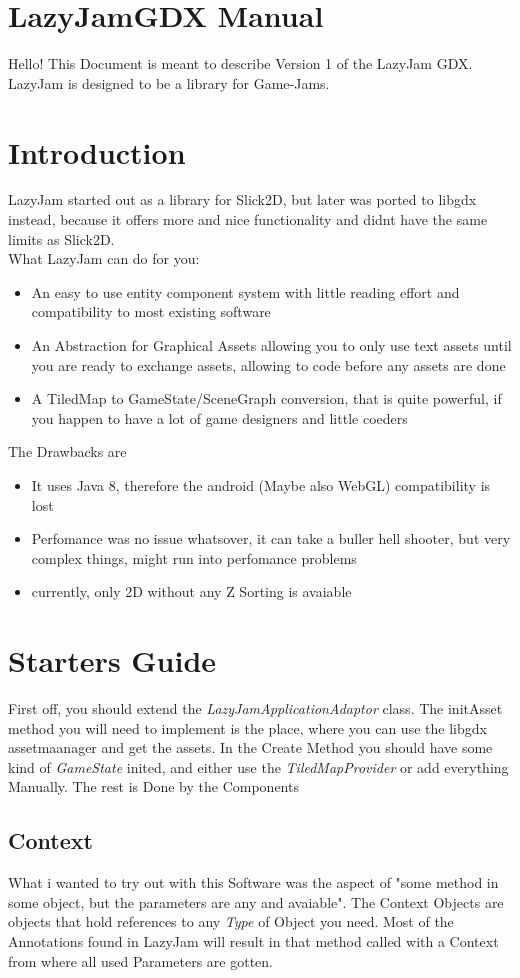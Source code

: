 \documentclass{article}
\begin{document}
\section{LazyJamGDX Manual}
Hello! This Document is meant to describe Version 1 of the LazyJam GDX.
LazyJam is designed to be a library for Game-Jams.

\section{Introduction}
LazyJam started out as a library for Slick2D, but later was ported to libgdx instead, because it offers more and nice functionality and didnt have the same limits as Slick2D.\\
What LazyJam can do for you:
\begin{itemize}
\item An easy to use entity component system with little reading effort and compatibility to most existing software
\item An Abstraction for Graphical Assets allowing you to only use text assets until you are ready to exchange assets, allowing to code before any assets are done
\item A TiledMap to GameState/SceneGraph conversion, that is quite powerful, if you happen to have a lot of game designers and little coeders
\end{itemize}
The Drawbacks are
\begin{itemize}
\item It uses Java 8, therefore the android (Maybe also WebGL) compatibility is lost
\item Perfomance was no issue whatsover, it can take a buller hell shooter, but very complex things, might run into perfomance problems
\item currently, only 2D without any Z Sorting is avaiable
\end{itemize}

\section{Starters Guide}
First off, you should extend the \emph{LazyJamApplicationAdaptor} class. The initAsset method you will need to implement is the place, where you can use the libgdx assetmaanager and get the assets.
In the Create Method you should have some kind of \emph{GameState} inited, and either use the \emph{TiledMapProvider} or add everything Manually.
The rest is Done by the Components
\subsection{Context}
What i wanted to try out with this Software was the aspect of "some method in some object, but the parameters are any and avaiable". The Context Objects are objects that hold references to any \emph{Type} of Object you need.
Most of the Annotations found in LazyJam will result in that method called with a Context from where all used Parameters are gotten. 
\end{document}
